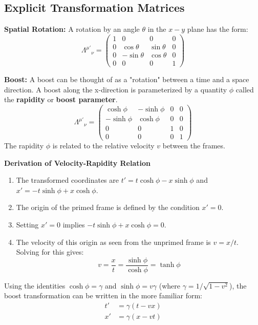 \documentclass[11pt, a4paper]{report}
\begin{document}
\subsection*{Explicit Transformation Matrices}

\textbf{Spatial Rotation:} A rotation by an angle $\theta$ in the $x-y$ plane has the form:
\begin{equation}\label{eq:rotation-matrix}
    {\Lambda^{\mu'}}_{\nu} =
    \begin{pmatrix}
        1 & 0 & 0 & 0 \\
        0 & \cos\theta & \sin\theta & 0 \\
        0 & -\sin\theta & \cos\theta & 0 \\
        0 & 0 & 0 & 1
    \end{pmatrix}
\end{equation}

\textbf{Boost:} A boost can be thought of as a "rotation" between a time and a space direction. A boost along the x-direction is parameterized by a quantity $\phi$ called the \textbf{rapidity} or \textbf{boost parameter}.
\begin{equation}\label{eq:boost-matrix}
    {\Lambda^{\mu'}}_{\nu} =
    \begin{pmatrix}
        \cosh\phi & -\sinh\phi & 0 & 0 \\
        -\sinh\phi & \cosh\phi & 0 & 0 \\
        0 & 0 & 1 & 0 \\
        0 & 0 & 0 & 1
    \end{pmatrix}
\end{equation}
The rapidity $\phi$ is related to the relative velocity $v$ between the frames.
\newline

\textbf{Derivation of Velocity-Rapidity Relation}
\begin{enumerate}
    \item The transformed coordinates are $t' = t \cosh\phi - x \sinh\phi$ and $x' = -t \sinh\phi + x \cosh\phi$.
    \item The origin of the primed frame is defined by the condition $x' = 0$.
    \item Setting $x' = 0$ implies $-t \sinh\phi + x \cosh\phi = 0$.
    \item The velocity of this origin as seen from the unprimed frame is $v = x/t$. Solving for this gives:
    \[
        v = \frac{x}{t} = \frac{\sinh\phi}{\cosh\phi} = \tanh\phi
    \]
\end{enumerate}
Using the identities $\cosh\phi = \gamma$ and $\sinh\phi = v\gamma$ (where $\gamma=1/\sqrt{1-v^2}$), the boost transformation can be written in the more familiar form:
\begin{align}
    t' &= \gamma(t - vx) \label{eq:lorentz-tprime} \\
    x' &= \gamma(x - vt) \label{eq:lorentz-xprime}
\end{align}
\end{document}
